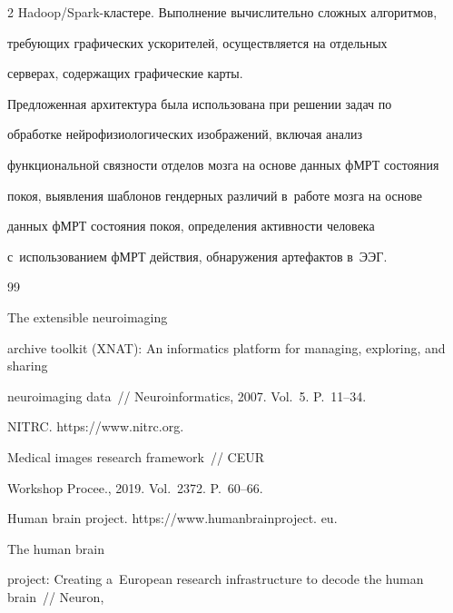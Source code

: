 \begin{multicols}{2}
Hadoop/Spark-клас\-те\-ре. Выполнение вычислительно сложных алгоритмов, 

требующих графических ускорителей, осуществляется на отдельных 

серверах, содержащих графические карты.

    

    Предложенная архитектура была использована при решении задач по 

обработке нейрофизиологических изображений, включая анализ 

функциональной связности отделов мозга на основе данных фМРТ состояния 

покоя, выявления шаблонов гендерных различий в~работе мозга на основе 

данных фМРТ состояния покоя, определения активности человека 

с~использованием фМРТ действия, обнаружения артефактов в~ЭЭГ.

    

{\small\frenchspacing

{%


\begin{thebibliography}{99}


   The extensible neuroimaging 

archive toolkit (XNAT): An informatics platform for managing, exploring, and sharing 

neuroimaging data~// Neuroinformatics, 2007. Vol.~5. P.~11--34.


  NITRC. {\sf https://www.nitrc.org}.

  


   Medical images research framework~// CEUR 

Workshop Procee., 2019. Vol.~2372. P.~60--66. 


  Human brain project. {\sf https://www.humanbrainproject. eu}.


   The human brain 

project: Creating a~European research infrastructure to decode the human brain~// Neuron, 


\end{thebibliography}}}
\end{multicols}
